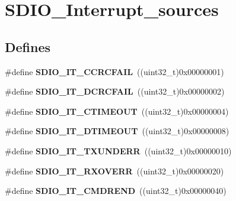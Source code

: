\hypertarget{group__SDIO__Interrupt__sources}{
\section{SDIO\_\-Interrupt\_\-sources}
\label{group__SDIO__Interrupt__sources}
}
\subsection*{Defines}
\begin{DoxyCompactItemize}
\item 
\hypertarget{group__SDIO__Interrupt__sources_gabb076105e18355a260c40a379511e72f}{
\#define {\bfseries SDIO\_\-IT\_\-CCRCFAIL}~((uint32\_\-t)0x00000001)}
\label{group__SDIO__Interrupt__sources_gabb076105e18355a260c40a379511e72f}

\item 
\hypertarget{group__SDIO__Interrupt__sources_gaf3321305cb4e24419185a4b92ead299a}{
\#define {\bfseries SDIO\_\-IT\_\-DCRCFAIL}~((uint32\_\-t)0x00000002)}
\label{group__SDIO__Interrupt__sources_gaf3321305cb4e24419185a4b92ead299a}

\item 
\hypertarget{group__SDIO__Interrupt__sources_ga3c2fdef0993f10e65d4fddbdf71febed}{
\#define {\bfseries SDIO\_\-IT\_\-CTIMEOUT}~((uint32\_\-t)0x00000004)}
\label{group__SDIO__Interrupt__sources_ga3c2fdef0993f10e65d4fddbdf71febed}

\item 
\hypertarget{group__SDIO__Interrupt__sources_gaf5ce4bfa8459ccbe892791e5cdc26a6f}{
\#define {\bfseries SDIO\_\-IT\_\-DTIMEOUT}~((uint32\_\-t)0x00000008)}
\label{group__SDIO__Interrupt__sources_gaf5ce4bfa8459ccbe892791e5cdc26a6f}

\item 
\hypertarget{group__SDIO__Interrupt__sources_ga93d4dbe3162b8507b2834a3e29e6c648}{
\#define {\bfseries SDIO\_\-IT\_\-TXUNDERR}~((uint32\_\-t)0x00000010)}
\label{group__SDIO__Interrupt__sources_ga93d4dbe3162b8507b2834a3e29e6c648}

\item 
\hypertarget{group__SDIO__Interrupt__sources_ga272953292e1b43b2108b00e75db76512}{
\#define {\bfseries SDIO\_\-IT\_\-RXOVERR}~((uint32\_\-t)0x00000020)}
\label{group__SDIO__Interrupt__sources_ga272953292e1b43b2108b00e75db76512}

\item 
\hypertarget{group__SDIO__Interrupt__sources_ga6df3bb694dc00e250cd22e16a03d6910}{
\#define {\bfseries SDIO\_\-IT\_\-CMDREND}~((uint32\_\-t)0x00000040)}
\label{group__SDIO__Interrupt__sources_ga6df3bb694dc00e250cd22e16a03d6910}


\end{DoxyCompactItemize}
